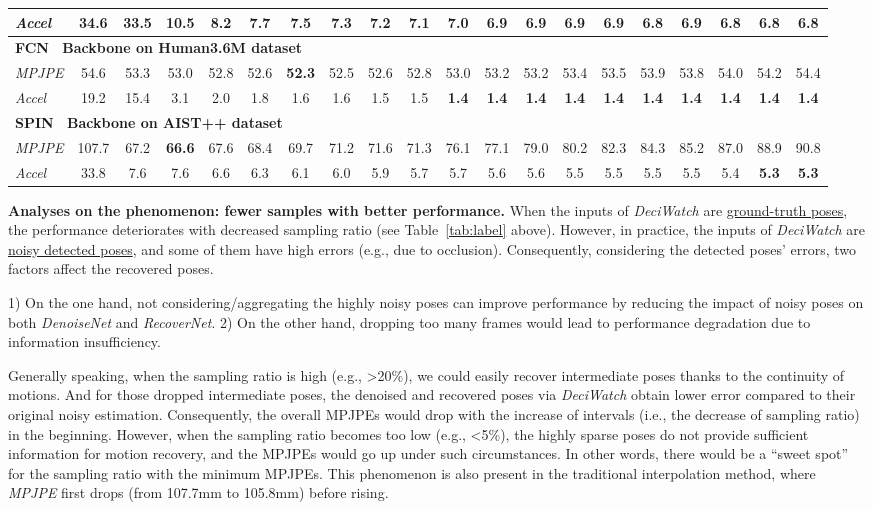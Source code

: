 \documentclass[runningheads]{llncs}
\newcommand{\name}{\emph{DeciWatch}\xspace}
\begin{document}
\begin{table}[h]
{\begin{tabular}{l|ccccccccccccccccccc}
\emph{Accel}  &34.6 &33.5 &10.5 &8.2 &7.7 & 7.5& 7.3& 7.2& 7.1&7.0 &6.9 &6.9 &6.9 &6.9 &\textbf{6.8} &6.9 &\textbf{6.8}&\textbf{6.8} &\textbf{6.8}
 \\\toprule \hline
 \multicolumn{20}{l}{\cellcolor{Gray}\textbf{FCN~\cite{martinez2017simple} Backbone on Human3.6M dataset} } \\\midrule[0.25pt]         
\emph{MPJPE}  &54.6 &53.3 & 53.0& 52.8& 52.6&\textbf{52.3} &52.5 &52.6 &52.8 &53.0 & 53.2& 53.2& 53.4& 53.5&53.9 &53.8 &54.0 &54.2 &54.4 \\
\emph{Accel}  &19.2 &15.4 &3.1 &2.0 &1.8 &1.6 &1.6 &1.5 &1.5 &\textbf{1.4} &\textbf{1.4} &\textbf{1.4} &\textbf{1.4} &\textbf{1.4} & \textbf{1.4}&\textbf{1.4} &\textbf{1.4} &\textbf{1.4} &\textbf{1.4}
 \\\toprule \hline
  \multicolumn{20}{l}{\cellcolor{Gray}\textbf{SPIN~\cite{kolotouros2019spin} Backbone on AIST++ dataset} }  \\\midrule[0.25pt]
\emph{MPJPE}  & 107.7&67.2 &\textbf{66.6} &67.6 &68.4 &69.7 &71.2 &71.6 &71.3 &76.1 &77.1 &79.0 &80.2 &82.3 &84.3 &85.2 &87.0 &88.9 &90.8 \\
\emph{Accel}  & 33.8& 7.6& 7.6&6.6 &6.3 &6.1 &6.0 &5.9 &5.7 &5.7 &5.6 &5.6 &5.5 &5.5 &5.5 &5.5 &5.4 &\textbf{5.3} &\textbf{5.3} 
 \\\bottomrule
\end{tabular}}
\end{table}

\noindent \textbf{Analyses on the phenomenon: fewer samples with better performance.}
When the inputs of \name are \underline{ground-truth poses}, the performance deteriorates with decreased sampling ratio (see Table~\ref{tab:label} above). However, in practice, the inputs of \name are \underline{noisy detected poses}, and some of them have high errors (e.g., due to occlusion). 
Consequently, considering the detected poses' errors, two factors affect the recovered poses.

1) On the one hand, not considering/aggregating the highly noisy poses can improve performance by reducing the impact of noisy poses on both \emph{DenoiseNet} and \emph{RecoverNet}. 2) On the other hand, dropping too many frames would lead to performance degradation due to information insufficiency.

Generally speaking, when the sampling ratio is high (e.g., \textgreater 20\%), we could easily recover intermediate poses thanks to the continuity of motions.
And for those dropped intermediate poses,
the denoised and recovered poses via \name obtain lower error compared to their original noisy estimation.
Consequently, the overall MPJPEs would drop with the increase of intervals (i.e., the decrease of sampling ratio) in the beginning. However, when the sampling ratio becomes too low (e.g., \textless 5\%), the highly sparse poses do not provide sufficient information for motion recovery, and the MPJPEs would go up under such circumstances. In other words, there would be a ``sweet spot'' for the sampling ratio with the minimum MPJPEs.  
This phenomenon is also present in the traditional interpolation method, where \emph{MPJPE} first drops (from 107.7mm to 105.8mm) before rising.
\end{document}
